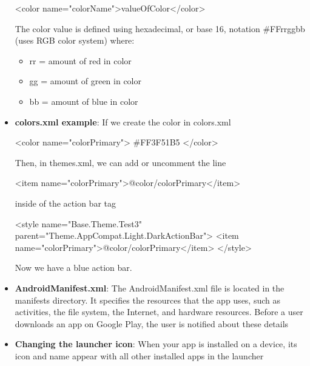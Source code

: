 \documentclass{report}
\begin{document}
\begin{itemize}
\begin{xmlcode}
            <color name="colorName">valueOfColor</color>
            \end{xmlcode}
            \bigbreak \noindent 
            The color value is defined using hexadecimal, or base 16, notation
            \bigbreak \noindent 
            \#FFrrggbb (uses RGB color system) where:
            \begin{itemize}
                \item rr = amount of red in color
                \item gg = amount of green in color
                \item bb = amount of blue in color
            \end{itemize}
        \item \textbf{colors.xml example}: If we create the color in colors.xml
            \bigbreak \noindent 
            \begin{xmlcode}
            <color name="colorPrimary"> #FF3F51B5 </color>
            \end{xmlcode}
            \bigbreak \noindent 
            Then, in themes.xml, we can add or uncomment the line
            \bigbreak \noindent 
            \begin{xmlcode}
            <item name="colorPrimary">@color/colorPrimary</item>
            \end{xmlcode}
            \bigbreak \noindent 
            inside of the action bar tag
            \bigbreak \noindent 
            \begin{xmlcode}
                <style name="Base.Theme.Test3" parent="Theme.AppCompat.Light.DarkActionBar">
                    <item name="colorPrimary">@color/colorPrimary</item>
                </style> 
            \end{xmlcode}
            \bigbreak \noindent 
            Now we have a blue action bar.
        \item \textbf{AndroidManifest.xml}: The AndroidManifest.xml file is located in the manifests directory.
            \bigbreak \noindent 
            It specifies the resources that the app uses, such as activities, the file system, the Internet, and hardware resources.
            \bigbreak \noindent 
            Before a user downloads an app on Google Play, the user is notified about these details
        \item \textbf{Changing the launcher icon}: When your app is installed on a device, its icon and name appear with all other installed apps in the launcher
            \bigbreak \noindent 

\end{itemize}
\end{document}

